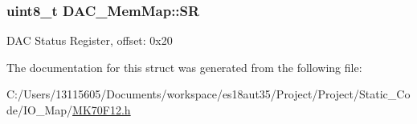 \subsubsection[{S\+R}]{\setlength{\rightskip}{0pt plus 5cm}uint8\+\_\+t D\+A\+C\+\_\+\+Mem\+Map\+::\+S\+R}\label{struct_d_a_c___mem_map_a146115dd60e5e34ce6f1d8dc2b860877}
D\+A\+C Status Register, offset\+: 0x20 

The documentation for this struct was generated from the following file\+:\begin{DoxyCompactItemize}
\item 
C\+:/\+Users/13115605/\+Documents/workspace/es18aut35/\+Project/\+Project/\+Static\+\_\+\+Code/\+I\+O\+\_\+\+Map/\hyperlink{_m_k70_f12_8h}{M\+K70\+F12.\+h}\end{DoxyCompactItemize}
